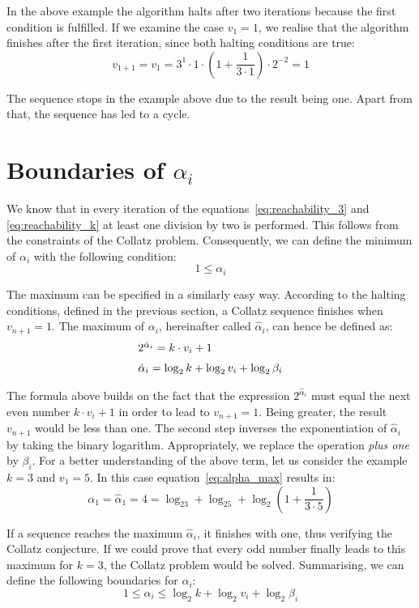 \documentclass{SciPress_2015}
\begin{document}
In the above example the algorithm halts after two iterations because the first condition is fulfilled. If we examine the case $v_1=1$, we realise that the algorithm finishes after the first iteration, since both halting conditions are true:
\[
v_{1+1}=v_1=3^1\cdot 1\cdot\left(1+\frac{1}{3\cdot1}\right)\cdot2^{-2}=1
\]

The sequence stops in the example above due to the result being one. Apart from that, the sequence has led to a cycle.

\section{Boundaries of \boldmath$\alpha_i$}
We know that in every iteration of the equations~\ref{eq:reachability_3} and \ref{eq:reachability_k} at least one division by two is performed. This follows from the constraints of the Collatz problem. Consequently, we can define the minimum of $\alpha_i$ with the following condition:
\[
1\le\alpha_i
\]

The maximum can be specified in a similarly easy way. According to the halting conditions, defined in the previous section, a Collatz sequence finishes when $v_{n+1}=1$. The maximum of $\alpha_i$, hereinafter called $\hat\alpha_i$, can hence be defined as:
\begin{equation}
\label{eq:alpha_max}
\begin{array}{l}
2^{\hat\alpha_i}=k\cdot v_i+1\\[\medskipamount]
\hat\alpha_i=\log_2k+\log_2v_i+\log_2\beta_i
\end{array}
\end{equation}

The formula above builds on the fact that the expression $2^{\hat\alpha_i}$ must equal the next even number $k\cdot v_i+1$ in order to lead to $v_{n+1}=1$. Being greater, the result $v_{n+1}$ would be less than one. The second step inverses the exponentiation of $\hat\alpha_i$ by taking the binary logarithm. Appropriately, we replace the operation \textit{plus one} by $\beta_i$. For a better understanding of the above term, let us consider the example $k=3$ and $v_1=5$. In this case equation~\ref{eq:alpha_max} results in:
\[
\alpha_1=\hat\alpha_1=4=\log_23+\log_25+\log_2\left(1+\frac{1}{3\cdot5}\right)
\]

If a sequence reaches the maximum $\hat\alpha_i$, it finishes with one, thus verifying the Collatz conjecture. If we could prove that every odd number finally leads to this maximum for $k=3$, the Collatz problem would be solved. Summarising, we can define the following boundaries for $\alpha_i$:
\begin{equation}
\label{eq:boundary_alpha_i}
1\le\alpha_i\le\log_2k+\log_2v_i+\log_2\beta_i
\end{equation}
\end{document}
